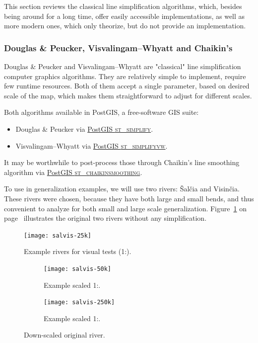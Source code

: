 \documentclass[a4paper]{article}
\newcommand{\onpage}[1]{\ref{#1} on page~\pageref{#1}}
\newcommand{\DP}{Douglas \& Peucker}
\newcommand{\VW}{Visvalingam--Whyatt}
\begin{document}
This section reviews the classical line simplification algorithms, which,
besides being around for a long time, offer easily accessible implementations,
as well as more modern ones, which only theorize, but do not provide an
implementation.

\subsubsection{{\DP}, {\VW} and Chaikin's}
\label{sec:dp-vw-chaikin}

{\DP}\cite{douglas1973algorithms} and {\VW}\cite{visvalingam1993line} are
"classical" line simplification computer graphics algorithms. They are
relatively simple to implement, require few runtime resources. Both of them
accept a single parameter, based on desired scale of the map, which makes them
straightforward to adjust for different scales.

Both algorithms available in PostGIS, a free-software GIS suite:
\begin{itemize}
    \item {\DP} via
        \href{https://postgis.net/docs/ST_Simplify.html}{PostGIS \textsc{st\_simplify}}.

    \item {\VW} via
        \href{https://postgis.net/docs/ST_SimplifyVW.html}{PostGIS
        \textsc{st\_simplifyvw}}.
\end{itemize}

It may be worthwhile to post-process those through Chaikin's line smoothing
algorithm\cite{chaikin1974algorithm} via
\href{https://postgis.net/docs/ST_ChaikinSmoothing.html}{PostGIS
\textsc{st\_chaikinsmoothing}}.

To use in generalization examples, we will use two rivers: Šalčia and Visinčia.
These rivers were chosen, because they have both large and small bends, and
thus convenient to analyze for both small and large scale generalization.
Figure~\onpage{fig:salvis-25} illustrates the original two rivers without any
simplification.

\begin{figure}[ht]
    \centering
    \texttt{[image: salvis-25k]}
    \caption{Example rivers for visual tests (1:{}).}
    \label{fig:salvis-25}
\end{figure}

\begin{figure}[ht]
    \centering
    \begin{subfigure}[b]{.49\textwidth}
        \texttt{[image: salvis-50k]}
        \caption{Example scaled 1:.}
        \label{fig:salvis-50k}
    \end{subfigure}
    \hfill
    \begin{subfigure}[b]{.49\textwidth}
        \centering
        \texttt{[image: salvis-250k]}
        \caption{Example scaled 1:.}
    \end{subfigure}
    \caption{Down-scaled original river.}
    \label{fig:salvis-50-250}
\end{figure}
\end{document}

